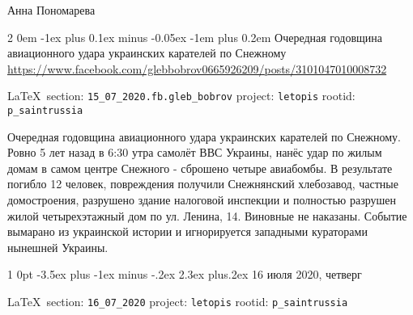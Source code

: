 \documentclass[a4paper,11pt]{extreport}
\makeatletter
\renewcommand\section{%
  \clearpage
  \@startsection{section}%
    {1}%
    {0pt}%
    {-3.5ex plus -1ex minus -.2ex}%
    {2.3ex plus.2ex}%
    {\centering\normalfont\Huge\bfseries}%
}
\renewcommand\subsection{%
  \clearpage
    \@startsection{subsection}%
    {2}%
    {0em}%
    {-1ex plus 0.1ex minus -0.05ex}%
    {-1em plus 0.2em}%
    {\scshape\bfseries\Large}%
}
\makeatother
\begin{document}
Анна Пономарева

 
 
\subsection{Очередная годовщина авиационного удара украинских карателей по Снежному}
\label{sec:15_07_2020.fb.gleb_bobrov}
\url{https://www.facebook.com/glebbobrov0665926209/posts/3101047010008732}
  
\vspace{0.5cm}
{\small\LaTeX~section: \verb|15_07_2020.fb.gleb_bobrov| project: \verb|letopis| rootid: \verb|p_saintrussia|}
\vspace{0.5cm}

Очередная годовщина авиационного удара украинских карателей по Снежному. Ровно
5 лет назад в 6:30 утра самолёт ВВС Украины, нанёс удар по жилым домам в самом
центре Снежного - сброшено четыре авиабомбы. В результате погибло 12 человек,
повреждения получили Снежнянский хлебозавод, частные домостроения, разрушено
здание налоговой инспекции и полностью разрушен жилой четырехэтажный дом по ул.
Ленина, 14. Виновные не наказаны. Событие вымарано из украинской истории и
игнорируется западными кураторами нынешней Украины.
  

  

 
 

\section{16 июля 2020, четверг}
\label{sec:16_07_2020}

\vspace{0.5cm}
{\ifDEBUG\small\LaTeX~section: \verb|16_07_2020| project: \verb|letopis| rootid: \verb|p_saintrussia|\fi}
\vspace{0.5cm}


 
\end{document}
